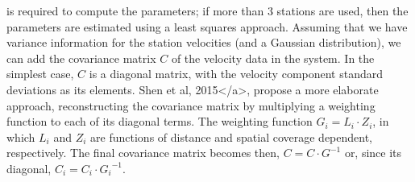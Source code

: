 \documentclass[landscape,a0paper,fontscale=0.340]{baposter} %
\begin{document}
\begin{poster}
{is required to compute the parameters; if more than 3 stations are used, then
the parameters are estimated using a least squares approach.
Assuming that we have variance information for the station velocities (and a Gaussian distribution),
we can add the covariance matrix \(C\) of the velocity data in the system.
In the simplest case, \(C\) is a diagonal matrix, with the velocity component
standard deviations as its elements.
Shen et al, 2015</a>, propose a more elaborate approach, reconstructing the
covariance matrix by multiplying a weighting function to each of its diagonal terms.
The weighting function \(G_i = L_i \cdot Z_i\), in which \(L_i\) and \(Z_i\)
are functions of distance and spatial coverage dependent, respectively.
The final covariance matrix becomes then, \(C = C \cdot G^{-1}\) or, since its diagonal,
\(C_i = C_i \cdot {G_i}^{-1}\).
}


\end{poster}
\end{document}

